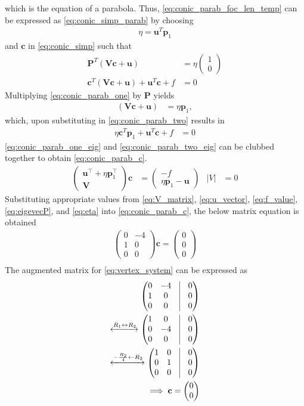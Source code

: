 \documentclass[journal,10pt,twocolumn]{article}
\providecommand{\abs}[1]{\left\vert#1\right\vert}
\let\vec\mathbf
\newcommand{\myvec}[1]{\ensuremath{\begin{pmatrix}#1\end{pmatrix}}}
\providecommand{\brak}[1]{\ensuremath{\left(#1\right)}}
\begin{document}
which is the equation of a parabola. 
Thus, \eqref{eq:conic_parab_foc_len_temp} 
can be expressed as \eqref{eq:conic_simp_parab} by choosing
\begin{align}
\eta = \vec{u}^T\vec{p}_1
\end{align}
and $\vec{c}$ in \eqref{eq:conic_simp} such that
\begin{align}
\label{eq:conic_parab_one}
\vec{P}^{T}\brak{\vec{V}\vec{c}+\vec{u}} &= \eta\myvec{1\\0}
\\
\vec{c}^T\brak{\vec{V}\vec{c} + \vec{u}}+ \vec{u}^T\vec{c} + f&= 0
\label{eq:conic_parab_two}
\end{align}
Multiplying \eqref{eq:conic_parab_one} by $\vec{P}$ yields
\begin{align}
\label{eq:conic_parab_one_eig}
\brak{\vec{V}\vec{c}+\vec{u}} &= \eta\vec{p}_1,
\end{align}
which, upon substituting in \eqref{eq:conic_parab_two}
results in 
\begin{align}
\eta\vec{c}^T\vec{p}_1 + \vec{u}^T\vec{c} + f&= 0
\label{eq:conic_parab_two_eig}
\end{align}
\eqref{eq:conic_parab_one_eig} and \eqref{eq:conic_parab_two_eig} can be clubbed together to obtain \eqref{eq:conic_parab_c}.
\begin{align}
    \myvec{ \vec{u}^{\top}+\eta\vec{p}_1^{\top} \\ \vec{V}}\vec{c} &= \myvec{-f \\ \eta\vec{p}_1-\vec{u}}  &\abs{V} &= 0
    \label{eq:conic_parab_c}
    \end{align}
Substituting appropriate values from \eqref{eq:V_matrix}, \eqref{eq:u_vector}, \eqref{eq:f_value}, \eqref{eq:eigevecP}, and \eqref{eq:eta} into \eqref{eq:conic_parab_c}, the below matrix equation is obtained
\begin{align}
	\label{eq:vertex_system}
	\myvec{0&-4\\1& 0\\0& 0}\vec{c} = \myvec{0 \\0 \\0}\\
\end{align}
The augmented matrix for \eqref{eq:vertex_system} can be expressed as
\begin{align}
	\label{eq:vertex_solv1}
	\myvec{0&-4&\vrule&0\\1&0&\vrule&0\\0&0&\vrule&0}\\ 	
	\label{eq:vertex_solv2}
	\xleftrightarrow[]{R_1 \leftrightarrow R_2}\myvec{1&0&\vrule&0\\0&-4&\vrule&0\\0&0&\vrule&0}\\
	\label{eq:vertex_solv3}
	\xleftrightarrow[]{-\frac{R_2}{4} \leftarrow R_2}\myvec{1&0&\vrule&0\\0&1&\vrule&0\\0&0&\vrule&0}\\
	\label{eq:vertex_solv4}
	\implies\vec{c} = \myvec{0\\0}
\end{align}
\end{document}
